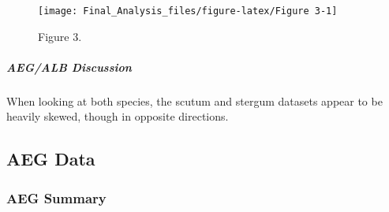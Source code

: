 \begin{figure}

{\centering \texttt{[image: Final\_Analysis\_files/figure-latex/Figure 3-1]} 

}

\caption{Figure 3.}\label{Figure Figure 3}
\end{figure}

\subparagraph{AEG/ALB Discussion}\label{aegalb-discussion}

When looking at both species, the scutum and stergum datasets appear to
be heavily skewed, though in opposite directions.

\subsection{AEG Data}\label{aeg-data}

\subsubsection{AEG Summary}\label{aeg-summary}

\begin{Shaded}
\begin{Highlighting}[]
\NormalTok{(}\NormalTok{(AEG[,}\NormalTok{:}\NormalTok{]), } \NormalTok{, } \NormalTok{)}
\end{Highlighting}
\end{Shaded}

